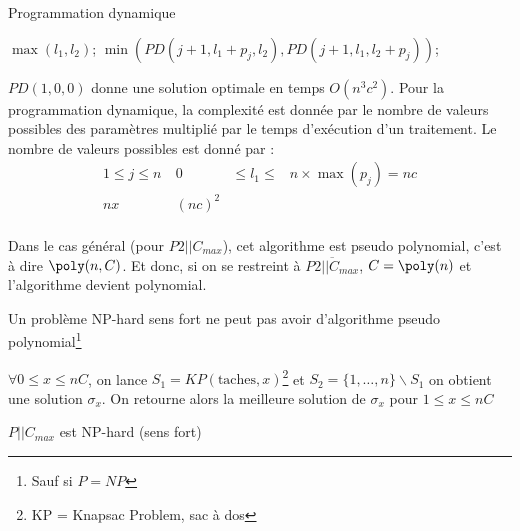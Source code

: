 \documentclass[a4paper, 11pt]{thesis}
\begin{document}
\begin{algorithm}[h!]
    \caption{Programmation dynamique}
    \label{pd_p2cmax}
    \begin{algorithmic}[1]
                \State \Return $\max(l_1, l_2)$;
            \Else
                \State \Return $\min(PD(j+1, l_1 + p_j, l_2), PD(j+1, l_1, l_2 + p_j))$;
            \EndIf
        \EndFunction
    \end{algorithmic}
\end{algorithm}

$PD(1, 0, 0)$ donne une solution optimale en temps $O(n^3c^2)$.
Pour la programmation dynamique, la complexité est donnée par le nombre de valeurs possibles des
paramètres multiplié par le temps d'exécution d'un traitement. Le nombre de valeurs possibles est
donné par : \begin{displaymath}
\begin{array}{rrcl}
    1 \leq j \leq n \ & 0 & \leq l_1 \leq & n \times \max(p_j) = nc \\
    nx \ & (nc)^2 \\
\end{array}\end{displaymath}

Dans le cas général (pour $P2 || C_{max}$), cet algorithme est pseudo polynomial, c'est à dire 
$\poly(n, C)$. Et donc, si on se restreint à $\overline{P2 || C_{max}}$, $C = \poly(n)$ et l'algorithme devient
polynomial.

\begin{rmq}
    Un problème NP-hard sens fort ne peut pas avoir d'algorithme pseudo polynomial\footnote{Sauf si $P =
    NP$}
\end{rmq}

\begin{rmq}
    $\forall 0 \leq x \leq nC$, on lance $S_1 = KP(\mbox{taches}, x)$\footnote{KP = Knapsac Problem,
    sac à dos} et $S_2 = \{1, \dots, n\} \backslash S_1$ on obtient une solution $\sigma_x$.
    On retourne alors la meilleure solution de $\sigma_x$ pour $1 \leq x \leq nC$
\end{rmq}

\begin{thrm}
    $P || C_{max}$ est NP-hard (sens fort)
\end{thrm}
\end{document}

